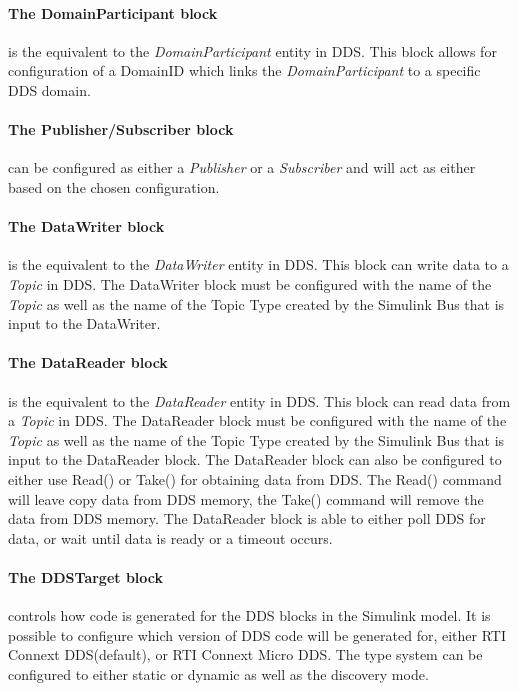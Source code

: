 \paragraph{The DomainParticipant block} is the equivalent to the \textit{DomainParticipant} entity in DDS. This block allows for configuration of a DomainID which links the \textit{DomainParticipant} to a specific DDS domain.

\paragraph{The Publisher/Subscriber block} can be configured as either a \textit{Publisher} or a \textit{Subscriber} and will act as either based on the chosen configuration.

\paragraph{The DataWriter block} is the equivalent to the \textit{DataWriter} entity in DDS. This block can write data to a \textit{Topic} in DDS. The DataWriter block must be configured with the name of the \textit{Topic} as well as the name of the Topic Type created by the Simulink Bus that is input to the DataWriter.

\paragraph{The DataReader block} is the equivalent to the \textit{DataReader} entity in DDS. This block can read data from a \textit{Topic} in DDS. The DataReader block must be configured with the name of the \textit{Topic} as well as the name of the Topic Type created by the Simulink Bus that is input to the DataReader block. The DataReader block can also be configured to either use Read() or Take() for obtaining data from DDS. The Read() command will leave copy data from DDS memory, the Take() command will remove the data from DDS memory. The DataReader block is able to either poll DDS for data, or wait until data is ready or a timeout occurs.

\paragraph{The DDSTarget block} controls how code is generated for the DDS blocks in the Simulink model. It is possible to configure which version of DDS code will be generated for, either RTI Connext DDS(default), or RTI Connext Micro DDS. The type system can be configured to either static or dynamic as well as the discovery mode.

